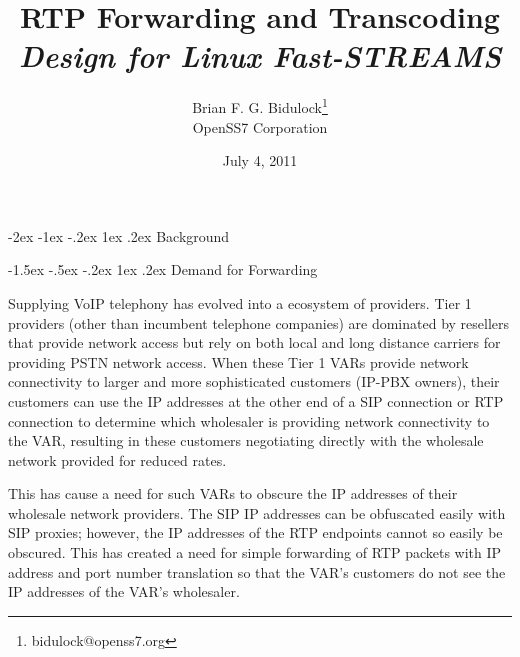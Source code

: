 \documentclass[letterpaper,final,notitlepage,twocolumn,10pt,twoside]{article}
\makeatletter
\let\large = \normalsize
\let\normalsize = \small
\let\small = \footnotesize
\let\footnotesize = \scriptsize
\let\scriptsize = \tiny
\renewcommand\section{\@startsection {section}{1}{\z@}%
                                   {-2ex \@plus -1ex \@minus -.2ex}%
                                   {1ex \@plus .2ex}%
                                   {\normalfont\large\bfseries}}
\renewcommand\subsection{\@startsection{subsection}{2}{\z@}%
                                     {-1.5ex \@plus -.5ex \@minus -.2ex}%
                                     {1ex \@plus .2ex}%
                                     {\normalfont\normalsize\bfseries}}
\makeatother
\begin{document}

\title{RTP Forwarding and Transcoding\\[0.5ex]
	{\large \textsl{Design for Linux Fast-STREAMS}}}
\author{Brian F. G. Bidulock\thanks{bidulock@openss7.org}\\
	OpenSS7 Corporation}
\date{July 4, 2011}
\maketitle

\begin{abstract}
\end{abstract}

\tableofcontents

\section{Background}

\subsection{Demand for Forwarding}

Supplying VoIP telephony has evolved into a ecosystem of providers.  Tier 1
providers (other than incumbent telephone companies) are dominated by resellers
that provide network access but rely on both local and long distance carriers
for providing PSTN network access.  When these Tier 1 VARs provide network
connectivity to larger and more sophisticated customers (IP-PBX owners), their
customers can use the IP addresses at the other end of a SIP connection or RTP
connection to determine which wholesaler is providing network connectivity to
the VAR, resulting in these customers negotiating directly with the wholesale
network provided for reduced rates.

This has cause a need for such VARs to obscure the IP addresses of their
wholesale network providers.  The SIP IP addresses can be obfuscated easily with
SIP proxies; however, the IP addresses of the RTP endpoints cannot so easily be
obscured.  This has created a need for simple forwarding of RTP packets with IP
address and port number translation so that the VAR's customers do not see the
IP addresses of the VAR's wholesaler.
\end{document}
